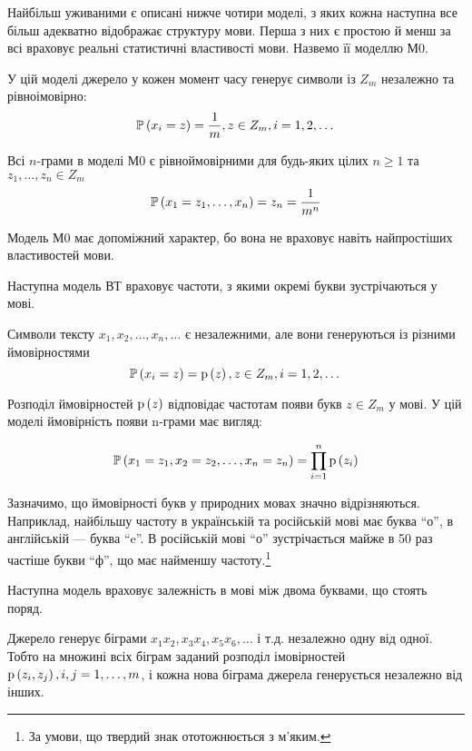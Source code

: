 Найбільш уживаними є описані нижче чотири моделі, з яких кожна наступна все
більш адекватно відображає структуру мови. Перша з них є простою й менш за всі
враховує реальні статистичні властивості мови. Назвемо її моделлю М0.
\begin{definition}[Модель M0]
    У цій моделі джерело у кожен момент часу генерує символи
    із  $Z_m$ незалежно та рівноімовірно:
    $$\mathbb{P}\left( x_i=z \right)=\frac{1}{m}, z \in Z_m, i = 1, 2, \dots$$

    Всі  $n$-грами в моделі М0 є рівноймовірними
    для  будь-яких цілих  ${n\ge 1}$ та
    $z_1,\dots,z_n \in Z_m$
    $$\mathbb{P}\left( x_1=z_1,\dots,x_n \right)=z_{{n}}=\frac{1}{m^n}$$

    Модель М0 має допоміжний характер,
    бо вона не враховує навіть найпростіших властивостей мови.
\end{definition}

Наступна модель ВТ враховує частоти, з якими окремі букви зустрічаються у мові.

\begin{definition}[Модель M1]
    Символи тексту  $x_1, x_2, \dots, x_n, \dots$ є
    незалежними, але вони генеруються із різними ймовірностями
    $$\mathbb{P}\left( x_i=z \right)=\mathrm{p}\left(z\right), z \in Z_m, i=1, 2, \dots$$

    Розподіл ймовірностей  $\mathrm{p}\left(z\right)$ відповідає частотам появи букв  $z \in Z_m$
    у мові. У цій моделі ймовірність появи n-грами має вигляд:

    $$\mathbb{P}\left( x_1=z_1, x_2=z_2, \dots, x_n=z_n \right)
        = \prod_{i=1}^n \mathrm{p}\left(z_i\right)$$

    Зазначимо, що ймовірності букв у природних мовах значно відрізняються.
    Наприклад,
    найбільшу частоту в українській та російській мові має буква “о”,
    в англійській --- буква ``e''.
    В російській мові ``о'' зустрічається майже в 50 раз частіше букви ``ф'',
    що має найменшу частоту.\footnote{За умови,
    що твердий знак ототожнюється з м’яким.}
\end{definition}

Наступна модель враховує залежність в мові між двома буквами, що стоять поряд.

\begin{definition}[Модель M2]
    Джерело генерує біграми $x_1 x_2, x_3 x_4, x_5 x_6, \dots$ і
    т.д. незалежно одну від одної.
    Тобто на множині всіх біграм заданий розподіл імовірностей
    $\mathrm{p}\left(z_i, z_j\right), i, j = 1 , \dots ,m$, і кожна
    нова біграма джерела генерується незалежно від інших.
\end{definition}

